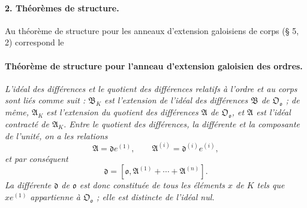 \paragraph{2. Théorèmes de structure.}
Au théorème de structure pour les anneaux d'extension galoisiens de corps (\S{} 5, 2) correspond le

\paragraph{Théorème de structure pour l'anneau d'extension galoisien des ordres.}
\emph{L'idéal des différences et le quotient des différences relatifs à l'ordre et au corps sont liés comme suit : $\mathfrak B_K$ est l'extension de l'idéal des différences $\mathfrak B$ de $\mathfrak O_{\mathfrak o}$ ; de même, $\mathfrak A_K$ est l'extension du quotient des différences $\mathfrak A$ de $\mathfrak O_{\mathfrak o}$, et $\mathfrak A$ est l'idéal contracté de $\mathfrak A_K$. Entre le quotient des différences, la différente et la composante de l'unité, on a les relations}
\[
\mathfrak A=\mathfrak d e^{(1)},
\qquad
\mathfrak A^{(i)}=\mathfrak d^{(i)}e^{(i)},
\]
\emph{et par conséquent}
\[
\mathfrak d=[\mathfrak o,\mathfrak A^{(1)}+\cdots+\mathfrak A^{(n)}].
\]
\emph{La différente $\mathfrak d$ de $\mathfrak o$ est donc constituée de tous les éléments $x$ de $K$ tels que $xe^{(1)}$ appartienne à $\mathfrak O_{\mathfrak o}$ ; elle est distincte de l'idéal nul.}

